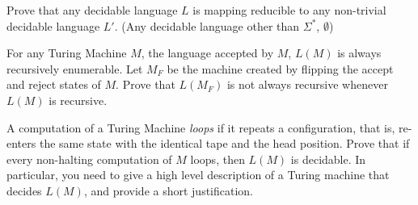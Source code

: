 \documentclass[solution, letterpaper]{cscie121}
\begin{document}

Prove that any decidable language $L$ is mapping reducible to any non-trivial decidable language $L'$. (Any decidable language other than $\Sigma^*$, $\emptyset$)

\begin{solution}
\end{solution}



For any Turing Machine $M$, the language accepted by $M$, $L(M)$ is always
recursively enumerable. Let $M_F$ be the machine created by flipping the accept
and reject states of $M$. Prove that $L(M_F)$ is not always recursive whenever $L(M)$ is recursive.

\begin{solution}
\end{solution}


A computation of a Turing Machine \emph{loops} if it repeats a configuration, that
is, re-enters the same state with the identical tape and the head
position. Prove that if every non-halting computation of $M$ loops, then $L(M)$ is decidable.
In particular, you need to give a high level description of a Turing machine that 
decides $L(M)$, and provide a short justification. 

\begin{solution}
\end{solution}
\end{document}
